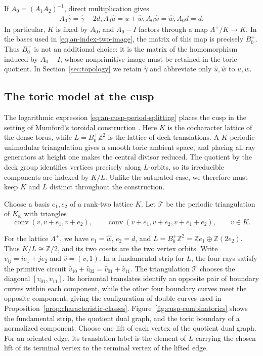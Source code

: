 If $A_0=(A_1A_2)^{-1}$, direct multiplication gives
\begin{equation}\label{eq:an-cusp-monodromy-interface}
 \begin{aligned}
 A_0\widehat\gamma=\widehat\gamma-2d,
 A_0\widehat u=\widehat u+\widehat w,
 A_0\widehat w=\widehat w,
 A_0d=d.
 \end{aligned}
\end{equation}
In particular, $K$ is fixed by $A_0$, and $A_0-I$ factors through a
map $\Lambda^+/K\to K$.  In the bases used in
\eqref{eq:an-index-two-image}, the matrix of this map is precisely
$B_0^+$.  Thus $B_0^+$ is not an additional choice: it is the matrix of
the homomorphism induced by $A_0-I$, whose nonprimitive image must be
retained in the toric quotient.
In Section~\ref{sec:topology} we retain $\widehat\gamma$ and abbreviate
only $\widehat u,\widehat w$ to $u,w$.

\subsection{The toric model at the cusp}

The logarithmic expression \eqref{eq:an-cusp-period-splitting} places the
cusp in the setting of Mumford's toroidal construction
\citep[Sections~2--3]{Mumford1972}.  Here $K$ is the
cocharacter lattice of the dense torus, while
$L=B_0^+\mathbb Z^2$ is the lattice of deck translations.  A
$K$-periodic unimodular triangulation gives a smooth toric ambient space,
and placing all ray generators at height one makes the central divisor
reduced.  The quotient by the deck group identifies vertices precisely along
$L$-orbits, so its irreducible components are indexed by $K/L$.  Unlike
the saturated case, we therefore must keep $K$ and $L$ distinct
throughout the construction.

Choose a basis $e_1,e_2$ of a rank-two lattice $K$.  Let $\mathcal T$
be the periodic triangulation of $K_{\mathbb R}$ with triangles
\[
 \operatorname{conv}(v,v+e_1,v+e_2),
 \qquad
 \operatorname{conv}(v+e_1,v+e_2,v+e_1+e_2),\qquad v\in K.
\]%

For the lattice $\Lambda^+$, we have
$e_1=\widehat w$, $e_2=d$, and
$L=B_0^+\mathbb Z^2=\mathbb Ze_1\oplus\mathbb Z(2e_2)$.
Thus $K/L\cong\mathbb Z/2$, and its two cosets are the two vertex orbits.
Write $v_{ij}=ie_1+je_2$ and $\widehat v=(v,1)$.  In a fundamental
strip for $L$, the four rays satisfy the primitive circuit
$\widehat v_{10}+\widehat v_{02}
=\widehat v_{01}+\widehat v_{11}$.
The triangulation $\mathcal T$ chooses the diagonal
$[v_{01},v_{11}]$.  Its horizontal translates identify an opposite pair
of boundary curves within each component, while the other four
boundary curves meet the opposite component, giving the configuration of
double curves used in Proposition~\ref{prop:characteristic-classes}.
Figure~\ref{fig:cusp-combinatorics} shows the fundamental strip, the quotient
dual graph, and the toric boundary of a normalized component.  Choose one
lift of each vertex of the
quotient dual graph.  For an oriented edge, its translation label is the
element of $L$ carrying the chosen lift of its terminal vertex to the
terminal vertex of the lifted edge.

